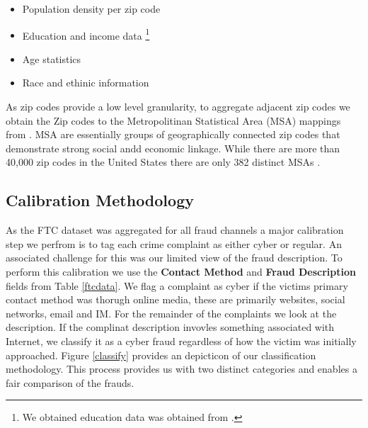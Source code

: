 \documentclass[conference]{IEEEtran}
\begin{document}
\begin{itemize}
\vspace{8pt}
  \item Population density per zip code
  \item Education and income data \footnote{We obtained education data was obtained from \cite{zipatlas}.}
  \item Age statistics
  \item Race and ethinic information
  \vspace{8pt}
\end{itemize}

As zip codes provide a low level granularity, to aggregate adjacent zip codes we obtain the Zip codes to the Metropolitinan Statistical Area (MSA) mappings from \cite{deptlabor}. MSA are essentially groups of geographically connected zip codes that demonstrate strong social andd economic linkage. While there are more than 40,000 zip codes in the United States there are only 382 distinct MSAs \cite{usbureau}.

\subsection{Calibration Methodology}

As the FTC dataset was aggregated for all fraud channels a major calibration step we perfrom is to tag each crime complaint as either cyber or regular. An associated challenge for this was our limited view of the fraud description. To perform this calibration we use the \textbf{Contact Method} and \textbf{Fraud Description} fields from Table \ref{ftcdata}. We flag a complaint as cyber if the victims primary contact method was thorugh online media, these are primarily websites, social networks, email and IM. For the remainder of the complaints we look at the description. If the complinat description invovles something associated with Internet, we classify it as a cyber fraud regardless of how the victim was initially approached. Figure \ref{classify} provides an depicticon of our classification methodology. This process  provides us with two distinct categories  and enables a fair comparison of the frauds. 
     
\end{document}
